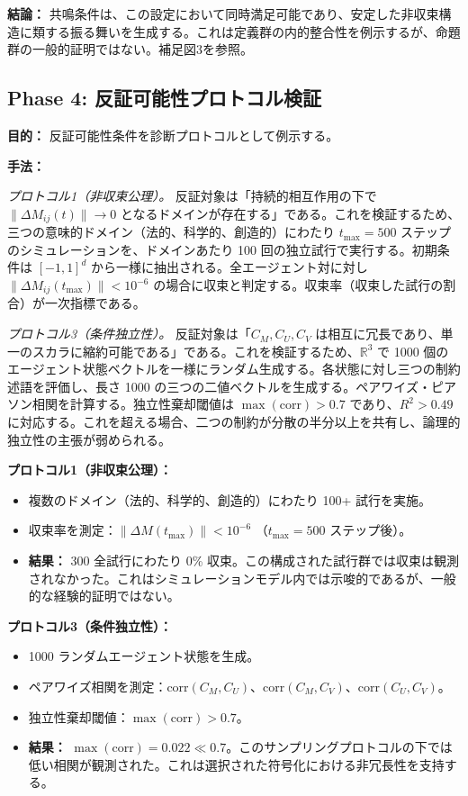 \documentclass[11pt,a4paper]{article}
\theoremstyle{definition}
\begin{document}
\textbf{結論：} 共鳴条件は、この設定において同時満足可能であり、安定した非収束構造に類する振る舞いを生成する。これは定義群の内的整合性を例示するが、命題群の一般的証明ではない。補足図3を参照。

\subsection{Phase 4: 反証可能性プロトコル検証}

\textbf{目的：} 反証可能性条件を診断プロトコルとして例示する。

\textbf{手法：}

\textit{プロトコル1（非収束公理）。} 反証対象は「持続的相互作用の下で $\|\Delta M_{ij}(t)\| \to 0$ となるドメインが存在する」である。これを検証するため、三つの意味的ドメイン（法的、科学的、創造的）にわたり $t_{\max} = 500$ ステップのシミュレーションを、ドメインあたり 100 回の独立試行で実行する。初期条件は $[-1, 1]^d$ から一様に抽出される。全エージェント対に対し $\|\Delta M_{ij}(t_{\max})\| < 10^{-6}$ の場合に収束と判定する。収束率（収束した試行の割合）が一次指標である。

\textit{プロトコル3（条件独立性）。} 反証対象は「$C_M, C_U, C_V$ は相互に冗長であり、単一のスカラに縮約可能である」である。これを検証するため、$\mathbb{R}^3$ で 1000 個のエージェント状態ベクトルを一様にランダム生成する。各状態に対し三つの制約述語を評価し、長さ 1000 の三つの二値ベクトルを生成する。ペアワイズ・ピアソン相関を計算する。独立性棄却閾値は $\max(\text{corr}) > 0.7$ であり、$R^2 > 0.49$ に対応する。これを超える場合、二つの制約が分散の半分以上を共有し、論理的独立性の主張が弱められる。

\textbf{プロトコル1（非収束公理）：}
\begin{itemize}
\item 複数のドメイン（法的、科学的、創造的）にわたり 100+ 試行を実施。
\item 収束率を測定：$\|\Delta M(t_{\max})\| < 10^{-6}$ （$t_{\max} = 500$ ステップ後）。
\item \textbf{結果：} 300 全試行にわたり 0\% 収束。この構成された試行群では収束は観測されなかった。これはシミュレーションモデル内では示唆的であるが、一般的な経験的証明ではない。
\end{itemize}

\textbf{プロトコル3（条件独立性）：}
\begin{itemize}
\item 1000 ランダムエージェント状態を生成。
\item ペアワイズ相関を測定：$\text{corr}(C_M, C_U)$、$\text{corr}(C_M, C_V)$、$\text{corr}(C_U, C_V)$。
\item 独立性棄却閾値：$\max(\text{corr}) > 0.7$。
\item \textbf{結果：} $\max(\text{corr}) = 0.022 \ll 0.7$。このサンプリングプロトコルの下では低い相関が観測された。これは選択された符号化における非冗長性を支持する。
\end{itemize}
\end{document}

